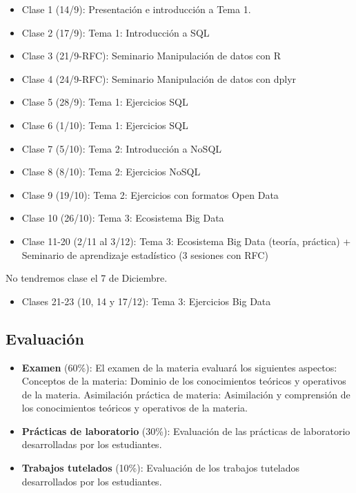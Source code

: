 \documentclass[]{book}
\providecommand{\tightlist}{%
  \setlength{\itemsep}{0pt}\setlength{\parskip}{0pt}}
\begin{document}
\begin{itemize}
\item
  Clase 1 (14/9): Presentación e introducción a Tema 1.
\item
  Clase 2 (17/9): Tema 1: Introducción a SQL
\item
  Clase 3 (21/9-RFC): Seminario Manipulación de datos con R
\item
  Clase 4 (24/9-RFC): Seminario Manipulación de datos con dplyr
\item
  Clase 5 (28/9): Tema 1: Ejercicios SQL
\item
  Clase 6 (1/10): Tema 1: Ejercicios SQL
\item
  Clase 7 (5/10): Tema 2: Introducción a NoSQL
\item
  Clase 8 (8/10): Tema 2: Ejercicios NoSQL
\item
  Clase 9 (19/10): Tema 2: Ejercicios con formatos Open Data
\item
  Clase 10 (26/10): Tema 3: Ecosistema Big Data
\item
  Clase 11-20 (2/11 al 3/12): Tema 3: Ecosistema Big Data (teoría,
  práctica) + Seminario de aprendizaje estadístico (3 sesiones con RFC)
\end{itemize}

No tendremos clase el 7 de Diciembre.

\begin{itemize}
\tightlist
\item
  Clases 21-23 (10, 14 y 17/12): Tema 3: Ejercicios Big Data
\end{itemize}

\subsection{Evaluación}\label{evaluaciuxf3n}

\begin{itemize}
\item
  \textbf{Examen} (60\%): El examen de la materia evaluará los
  siguientes aspectos: Conceptos de la materia: Dominio de los
  conocimientos teóricos y operativos de la materia. Asimilación
  práctica de materia: Asimilación y comprensión de los conocimientos
  teóricos y operativos de la materia.
\item
  \textbf{Prácticas de laboratorio} (30\%): Evaluación de las prácticas
  de laboratorio desarrolladas por los estudiantes.
\item
  \textbf{Trabajos tutelados} (10\%): Evaluación de los trabajos
  tutelados desarrollados por los estudiantes.
\end{itemize}
\end{document}
